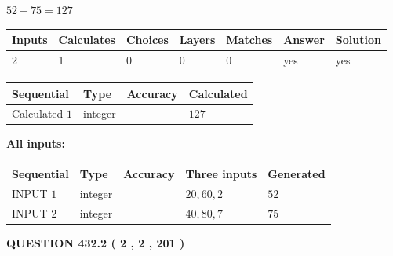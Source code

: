 \documentclass[12pt]{article}
\begin{document}
 

$ %
52 +  %
75=   %
127$
 
 
\noindent{}
 
 

 
   
   
   
   
\noindent\begin{tabular}{|l|l|l|l|l|l|l|}
 \hline
Inputs & Calculates & Choices & Layers & Matches & Answer & Solution \\ \hline
 2  & 
 1  & 
 0
  & 
 0  & 
 0  & 
  yes & 
  yes 
  \\ \hline
 \end{tabular}
   
   
   
   
\noindent{}
   
   
  
  
\noindent\begin{tabular}{|l|l|l|l|}
\hline
 Sequential & Type & Accuracy & Calculated \\ 
\hline
 
 
  Calculated $  1 $ & integer &  & 
  $ 127 $ 
 \\  \hline  
 \end{tabular}
   
   
   
   
\noindent\vspace{0.1in}\hspace{-0.08in} {\textbf{\Large{All inputs: }}}
   
   
  
  
\noindent\begin{tabular}{|l|l|l|l|l|}
\hline
 Sequential & Type & Accuracy & Three inputs & Generated \\ 
\hline
 
 
  INPUT $  1 $ & integer &  & $
 20
 , 
 60
 , 
 2
 $ & $ 52 $ 
 \\  \hline  
 
 
  INPUT $  2 $ & integer &  & $
 40
 , 
 80
 , 
 7
 $ & $ 75 $ 
 \\  \hline  
 \end{tabular}
   
   
  
\vspace{0.2in}
  
{\textbf{\Large{QUESTION
432.2 
 ( 2 , 2 , 201 )
}}}
  
\end{document}
